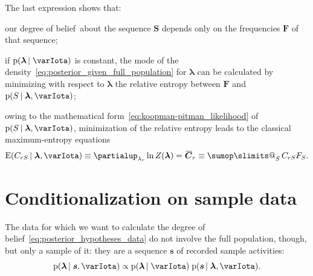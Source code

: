 \documentclass[\ifafour a4paper,12pt,\else a5paper,10pt,\fi%
onecolumn,oneside,article,%
british%
]{memoir}
\makeatletter
\theoremstyle{remark}
\theoremstyle{innote}
\def\sum{\DOTSI\sumop\slimits@}
\newcommand*{\de}{\partialup}%
\newcommand*{\pf}{\mathrm{p}}%
\newcommand*{\E}{\mathrm{E}}
\renewcommand*{\|}{\nonscript\,\vert\nonscript\;\mathopen{}}
\newcommand*{\tsum}{\mathop{\textstyle\sum}\nolimits}
\newcommand*{\widebar}[1]{{\mkern1.5mu\skew{2}\overline{\mkern-1.5mu#1\mkern-1.5mu}\mkern 1.5mu}}
\newcommand*{\dob}{degree of belief}
\newcommand*{\yS}{S}
\newcommand*{\ySt}{\bm{\yS}}
\newcommand*{\ys}{s}
\newcommand*{\yst}{\bm{\ys}}
\newcommand*{\yll}{\lambda}
\newcommand*{\yl}{\bm{\lambda}}
\newcommand*{\yc}{\widebar{\bm{C}}}
\newcommand*{\yI}{\varIota}
\newcommand*{\yF}{\bm{F}}
\makeatother
\begin{document}
The last expression shows that:
\begin{enumerate*}[label=(\alph*),mode=unboxed]
\item our \dob\ about the sequence $\ySt$ depends only on the frequencies
  $\yF$ of that sequence;
\item if $\pf(\yl \| \yI)$ is constant, the mode of the
  density~\eqref{eq:posterior_given_full_population} for $\yl$ can be
  calculated by minimizing with respect to $\yl$ the relative entropy
  between $\yF$ and $\pf(\yS \| \yl, \yI)$;
\item owing to the mathematical form~\eqref{eq:koopman-pitman_likelihood}
  of $\pf(\yS \| \yl, \yI)$, minimization of the relative entropy leads to
  the classical maximum-entropy equations
  \begin{equation}
    \label{eq:standard_maxent_eqns}
    \E(C_{r\yS} \| \yl, \yI) \equiv
        \de_{\yll_{r}}\ln Z(\yl) = \yc_{r} \equiv \tsum_{\yS} C_{r\yS} F_{\yS}.
  \end{equation}
\end{enumerate*}

\section{Conditionalization on sample data}
\label{sec:sample_data}


The data for which we want to calculate the
\dob~\eqref{eq:posterior_hypotheses_data} do not involve the full
population, though, but only a sample of it: they are a sequence $\yst$ of
recorded sample activities:
\begin{equation}
  \label{eq:posterior_given_sample}
  \pf(\yl \| \yst, \yI) \propto \pf(\yl \| \yI)\;
  \pf(\yst \| \yl, \yI).
\end{equation}
\end{document}
